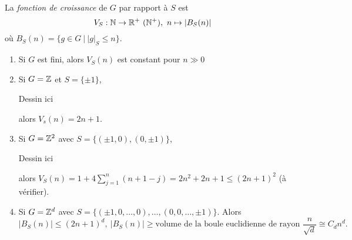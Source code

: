     \begin{defi}
      La \emph{fonction de croissance}  de $G$ par rapport à $S$ est
        \[V_S: \mathbb{N} \to \mathbb{R}^+\ (\mathbb{N}^+),\ n \mapsto |B_S(n)| \]
      où $B_S(n) = \{g \in G\ |\ |g|_S \leq n\}$.
    \end{defi}

    \begin{exs}
      \begin{enumerate}
      \item Si $G$ est fini, alors $V_S(n)$ est constant pour $n \gg 0$

      \item Si $G = \mathbb{Z}$ et $S = \{\pm 1\}$,
        \begin{center}
          Dessin ici
        \end{center}
        alors $V_s(n) = 2n + 1$.

      \item Si $G = \mathbb{Z}^2$ avec $S = \{(\pm 1, 0), (0, \pm 1)\}$,
        \begin{center}
          Dessin ici
        \end{center}
        alors $V_S(n) = 1 + 4 \sum_{j=1}^n(n+1-j) = 2n^2 + 2n + 1 \leq (2n+1)^2$ (à vérifier).

      \item Si $G = \mathbb{Z}^d$ avec $S = \{(\pm 1, 0, \ldots, 0), \ldots, (0, 0, \ldots, \pm 1)\}$. Alors
        \[|B_S(n)| \leq (2n+1)^d,\ |B_S(n)| \geq \text{volume de la boule euclidienne de rayon }
        \frac{n}{\sqrt{d}} \cong C_dn^d.\]


\end{enumerate}
\end{exs}
